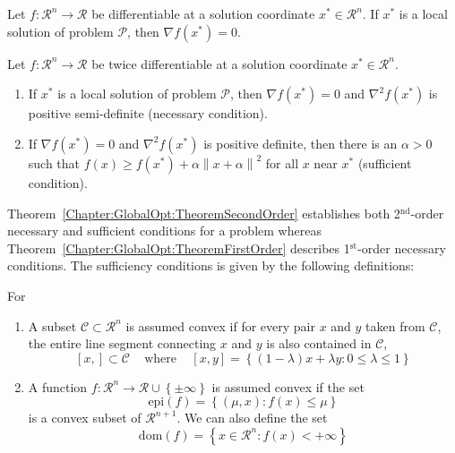 \begin{thm}\label{Chapter:GlobalOpt:TheoremFirstOrder}
Let $f:\mathcal{R}^{n}\rightarrow\mathcal{R}$ be differentiable at a solution coordinate $x^{\ast}\in\mathcal{R}^{n}$. If $x^{\ast}$ is a local solution of problem $\mathcal{P}$, then $\nabla f\left(x^{\ast}\right)=0$.
\end{thm}

\begin{thm}\label{Chapter:GlobalOpt:TheoremSecondOrder}
Let $f:\mathcal{R}^{n}\rightarrow\mathcal{R}$ be twice differentiable at a solution coordinate $x^{\ast}\in\mathcal{R}^{n}$. 
   \begin{enumerate}
       \item If $x^{\ast}$ is a local solution of problem $\mathcal{P}$, then $\nabla f\left(x^{\ast}\right)=0$ and $\nabla^{2}f\left(x^{\ast}\right)$ is positive semi-definite (necessary condition).
       \item If $\nabla f\left(x^{\ast}\right)=0$ and $\nabla^{2}f\left(x^{\ast}\right)$ is positive definite, then there is an $\alpha > 0$ such that $f\left(x\right)\ge f\left(x^{\ast}\right)+\alpha\left\|x+\alpha\right\|^{2}$ for all $x$ near $x^{\ast}$ (sufficient condition).
   \end{enumerate}
\end{thm}
Theorem~\ref{Chapter:GlobalOpt:TheoremSecondOrder} establishes both 2$^{\text{nd}}$-order necessary and sufficient conditions for a problem whereas Theorem~\ref{Chapter:GlobalOpt:TheoremFirstOrder} describes 1$^{\text{st}}$-order necessary conditions. The sufficiency conditions is given by the following definitions:

\begin{defn} For
   \begin{enumerate}
       \item A subset $\mathcal{C}\subset\mathcal{R}^{n}$ is assumed convex if for every pair $x$ and $y$ taken from $\mathcal{C}$, the entire line segment connecting $x$ and $y$ is also contained in $\mathcal{C}$,
           \begin{displaymath}
              \left[x,\right]\subset\mathcal{C}\;\;\;\text{ where }\;\;\; \left[x,y\right]=\left\{\left(1-\lambda\right)x +\lambda y : 0\le\lambda\le 1\right\}
           \end{displaymath}
       \item A function $f:\mathcal{R}^{n}\rightarrow \mathcal{R}\cup\left\{\pm\infty\right\}$ is assumed convex if the set
           \begin{displaymath}
              \text{epi}(f) = \left\{\left(\mu,x\right): f(x)\le \mu\right\}
           \end{displaymath}
           is a convex subset of $\mathcal{R}^{n+1}$. We can also define the set 
           \begin{displaymath}
              \text{dom}(f) = \left\{x\in\mathcal{R}^{n} : f(x) < +\infty\right\}
           \end{displaymath}
   \end{enumerate}
\end{defn}

